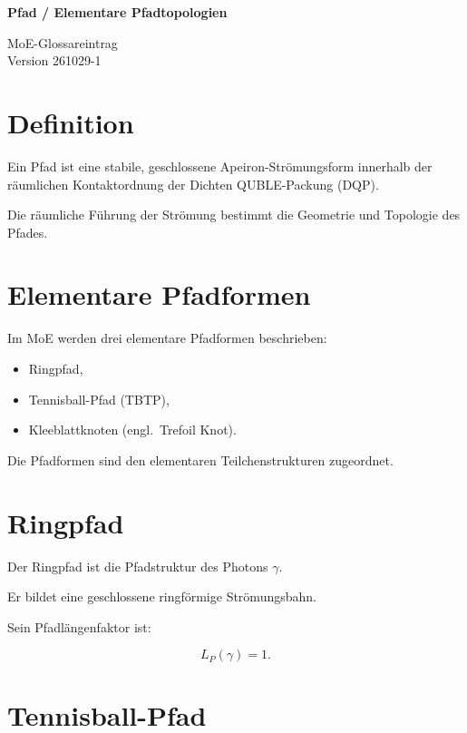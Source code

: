 \documentclass[11pt,a4paper]{article}
\begin{document}
\vspace*{-1.8cm}

\noindent
\begin{minipage}[t]{0.66\textwidth}
{\LARGE\bfseries Pfad /
Elementare Pfadtopologien}
\end{minipage}
\hfill
\begin{minipage}[t]{0.30\textwidth}
\raggedleft
{\small MoE-Glossareintrag}\\
{\small Version 261029-1}
\end{minipage}

\vspace{1.4em}

\section*{Definition}

Ein Pfad ist eine stabile,
geschlossene Apeiron-Strömungsform
innerhalb der räumlichen
Kontaktordnung der Dichten
QUBLE-Packung (DQP).

Die räumliche Führung der
Strömung bestimmt die Geometrie
und Topologie des Pfades.

\section*{Elementare Pfadformen}

Im MoE werden drei elementare
Pfadformen beschrieben:

\begin{itemize}
\item Ringpfad,
\item Tennisball-Pfad (TBTP),
\item Kleeblattknoten
      (engl.\ Trefoil Knot).
\end{itemize}

Die Pfadformen sind den
elementaren Teilchenstrukturen
zugeordnet.

\section*{Ringpfad}

Der Ringpfad ist die
Pfadstruktur des Photons
$\gamma$.

Er bildet eine geschlossene
ringförmige Strömungsbahn.

Sein Pfadlängenfaktor ist:

\[
L_P(\gamma)=1.
\]

\section*{Tennisball-Pfad}
\end{document}
